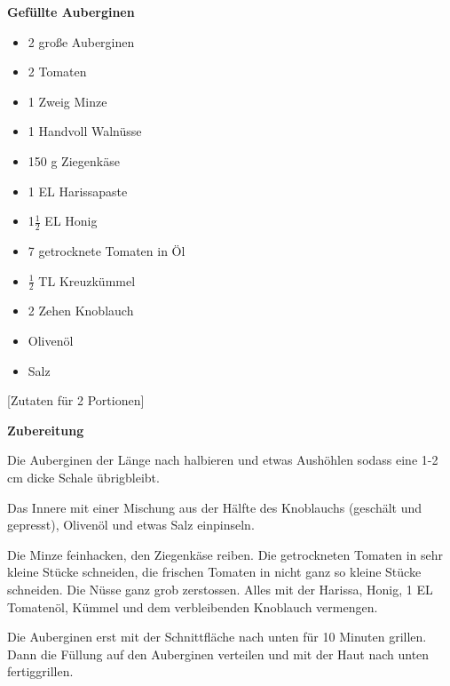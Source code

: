 

\parindent0pt	

\pagestyle{empty}


\textbf{{\LARGE Gefüllte Auberginen}}%

\hrulefill
\vspace*{\fill}
\begin{multicols}{2}	


\begin{itemize}
\item 2 große Auberginen
\item 2 Tomaten
\item 1 Zweig Minze
\item 1 Handvoll Walnüsse
\item 150 g Ziegenkäse
\item 1 EL Harissapaste
\item 1$\frac{1}{2}$ EL Honig
\item 7 getrocknete Tomaten in Öl
\item $\frac{1}{2}$ TL Kreuzkümmel
\item 2 Zehen Knoblauch
\item Olivenöl
\item Salz
\end{itemize}
\end{multicols}
\vfill									%

\vspace{1cm}
%
\begin{center}
%
[Zutaten für 2 Portionen]%
\end{center}


\vfill
\newpage
\textbf{{\LARGE Zubereitung}}%

\hrulefill

\vspace*{\fill}
\begin{multicols}{2}

Die Auberginen der Länge nach halbieren und etwas Aushöhlen sodass eine 1-2 cm dicke Schale übrigbleibt.\newline

Das Innere mit einer Mischung aus der Hälfte des Knoblauchs (geschält und gepresst), Olivenöl und etwas Salz einpinseln.\newline

Die Minze feinhacken, den Ziegenkäse reiben. Die getrockneten Tomaten in sehr kleine Stücke schneiden, die frischen Tomaten in nicht ganz so kleine Stücke schneiden.\newline
Die Nüsse ganz grob zerstossen. Alles mit der Harissa, Honig, 1 EL Tomatenöl,  Kümmel und dem verbleibenden Knoblauch vermengen.\newline

Die Auberginen erst mit der Schnittfläche nach unten für 10 Minuten grillen. Dann die Füllung auf den Auberginen verteilen und mit der Haut nach unten fertiggrillen.

\end{multicols}
\vfill
